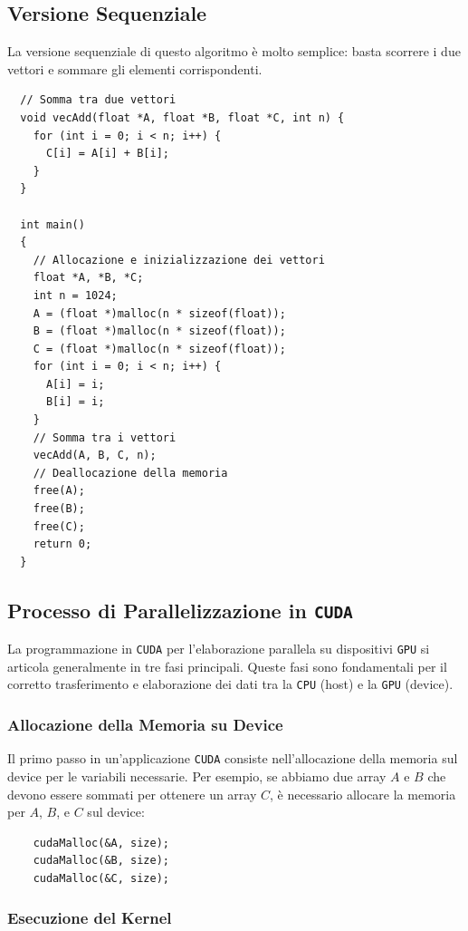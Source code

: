 \subsection{Versione Sequenziale}
La versione sequenziale di questo algoritmo è molto semplice: basta
scorrere i due vettori e sommare gli elementi corrispondenti.

\begin{lstlisting}
  // Somma tra due vettori
  void vecAdd(float *A, float *B, float *C, int n) {
    for (int i = 0; i < n; i++) {
      C[i] = A[i] + B[i];
    }
  }

  int main()
  {
    // Allocazione e inizializzazione dei vettori
    float *A, *B, *C;
    int n = 1024;
    A = (float *)malloc(n * sizeof(float));
    B = (float *)malloc(n * sizeof(float));
    C = (float *)malloc(n * sizeof(float));
    for (int i = 0; i < n; i++) {
      A[i] = i;
      B[i] = i;
    }
    // Somma tra i vettori
    vecAdd(A, B, C, n);
    // Deallocazione della memoria
    free(A);
    free(B);
    free(C);
    return 0;
  }
\end{lstlisting}

\subsection{Processo di Parallelizzazione in \texttt{CUDA}}

La programmazione in \texttt{CUDA} per l'elaborazione parallela su dispositivi \texttt{GPU} si articola generalmente in tre fasi principali. Queste fasi sono fondamentali per il corretto trasferimento e elaborazione dei dati tra la \texttt{CPU} (host) e la \texttt{GPU} (device).

\subsubsection{Allocazione della Memoria su Device}

Il primo passo in un'applicazione \texttt{CUDA} consiste nell'allocazione della memoria sul device per le variabili necessarie. Per esempio, se abbiamo due array \(A\) e \(B\) che devono essere sommati per ottenere un array \(C\), è necessario allocare la memoria per \(A\), \(B\), e \(C\) sul device:

\begin{lstlisting}
    cudaMalloc(&A, size);
    cudaMalloc(&B, size);
    cudaMalloc(&C, size);
\end{lstlisting}

\subsubsection{Esecuzione del Kernel}

